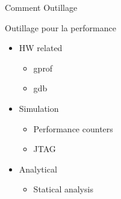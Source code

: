 %
\begin{Frame}{Comment Outillage}
      \begin{block}{Outillage pour la performance}
        \begin{itemize}
        \item HW related
          \begin{itemize}
          \item gprof
          \item gdb
          \end{itemize}
        \item Simulation
          \begin{itemize}
          \item Performance counters
          \item JTAG
          \end{itemize}
        \item Analytical
          \begin{itemize}
          \item Statical analysis
          \end{itemize}
        \end{itemize}
      \end{block} 
\end{Frame}


